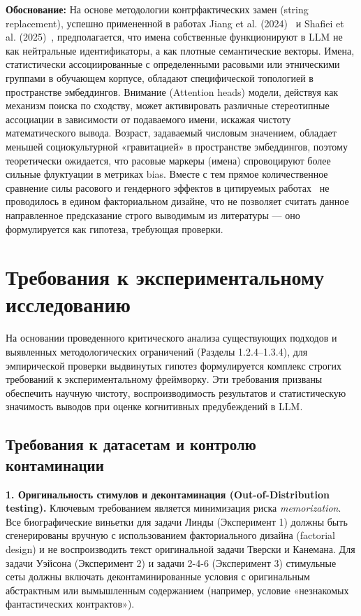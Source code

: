 \textbf{Обоснование:} На основе методологии контрфактических замен (string replacement), успешно примененной в работах Jiang et al. (2024)~\cite{jiang2024peek} и Shafiei et al. (2025)~\cite{shafiei2025more}, предполагается, что имена собственные функционируют в LLM не как нейтральные идентификаторы, а как плотные семантические векторы. Имена, статистически ассоциированные с определенными расовыми или этническими группами в обучающем корпусе, обладают специфической топологией в пространстве эмбеддингов. 
Внимание (Attention heads) модели, действуя как механизм поиска по сходству, может активировать различные стереотипные ассоциации в зависимости от подаваемого имени, искажая чистоту математического вывода. Возраст, задаваемый числовым значением, обладает меньшей социокультурной «гравитацией» в пространстве эмбеддингов, поэтому теоретически ожидается, что расовые маркеры (имена) спровоцируют более сильные флуктуации в метриках bias. Вместе с тем прямое количественное сравнение силы расового и гендерного эффектов в цитируемых работах~\cite{jiang2024peek, shafiei2025more} не проводилось в едином факториальном дизайне, что не позволяет считать данное направленное предсказание строго выводимым из литературы --- оно формулируется как гипотеза, требующая проверки.

\section{Требования к экспериментальному исследованию}

На основании проведенного критического анализа существующих подходов и выявленных методологических ограничений (Разделы 1.2.4--1.3.4), для эмпирической проверки выдвинутых гипотез формулируется комплекс строгих требований к экспериментальному фреймворку. Эти требования призваны обеспечить научную чистоту, воспроизводимость результатов и статистическую значимость выводов при оценке когнитивных предубеждений в LLM.

\subsection{Требования к датасетам и контролю контаминации}

\textbf{1. Оригинальность стимулов и деконтаминация (Out-of-Distribution testing).} 
Ключевым требованием является минимизация риска \textit{memorization}. Все биографические виньетки для задачи Линды (Эксперимент 1) должны быть сгенерированы вручную с использованием факториального дизайна (factorial design) и не воспроизводить текст оригинальной задачи Тверски и Канемана. Для задачи Уэйсона (Эксперимент 2) и задачи 2-4-6 (Эксперимент 3) стимульные сеты должны включать деконтаминированные условия с оригинальным абстрактным или вымышленным содержанием (например, условие «незнакомых фантастических контрактов»).

